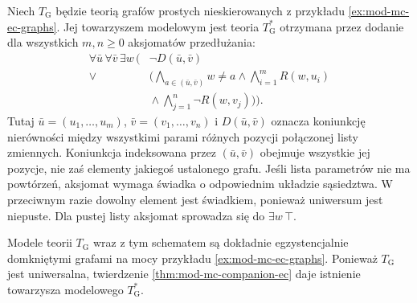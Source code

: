 \begin{przyklad}
\label{ex:mod-mc-companion-graphs}
Niech $T_{\mathrm G}$ będzie teorią grafów prostych
nieskierowanych z przykładu \ref{ex:mod-mc-ec-graphs}.
Jej towarzyszem modelowym jest teoria
$T_{\mathrm G}^*$ otrzymana przez dodanie dla wszystkich
$m,n\geq0$ aksjomatów przedłużania:
\[
\begin{aligned}
\forall\bar u\,\forall\bar v\,\exists w\,\bigg(
 &\neg D(\bar u,\bar v)\\
 {}\lor{}&
 \Big(\bigwedge_{a\in(\bar u,\bar v)}w\ne a
 \land\bigwedge_{i=1}^{m}R(w,u_i)\\
 &{}\land\bigwedge_{j=1}^{n}\neg R(w,v_j)\Big)\bigg).
\end{aligned}
\]
Tutaj $\bar u=(u_1,\ldots,u_m)$,
$\bar v=(v_1,\ldots,v_n)$ i $D(\bar u,\bar v)$
oznacza koniunkcję nierówności między wszystkimi
parami różnych pozycji połączonej listy zmiennych.
Koniunkcja indeksowana przez $(\bar u,\bar v)$
obejmuje wszystkie jej pozycje, nie zaś elementy
jakiegoś ustalonego grafu.
Jeśli lista parametrów nie ma powtórzeń, aksjomat
wymaga świadka o odpowiednim układzie sąsiedztwa.
W przeciwnym razie dowolny element jest świadkiem,
ponieważ uniwersum jest niepuste.
Dla pustej listy aksjomat sprowadza się do
$\exists w\,\top$.

Modele teorii $T_{\mathrm G}$ wraz z tym schematem
są dokładnie egzystencjalnie domkniętymi grafami
na mocy przykładu
\ref{ex:mod-mc-ec-graphs}. Ponieważ $T_{\mathrm G}$
jest uniwersalna, twierdzenie
\ref{thm:mod-mc-companion-ec} daje istnienie
towarzysza modelowego $T_{\mathrm G}^*$.
\end{przyklad}

